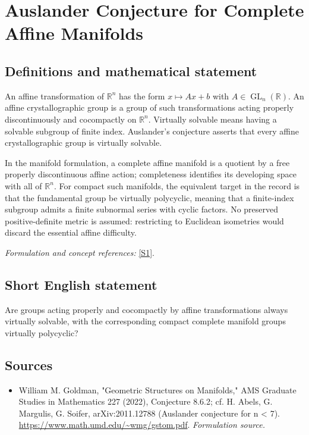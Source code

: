 \documentclass[11pt]{article}
\begin{document}
\section*{\texorpdfstring{Auslander Conjecture for Complete Affine Manifolds}{Auslander Conjecture for Complete Affine Manifolds}}\label{statement}
\subsection{Definitions and mathematical statement}
An affine transformation of ${\mathbb{R}}^n$ has the form $x\mapsto Ax+b$ with $A\in\operatorname{GL}_n({\mathbb{R}})$. An affine crystallographic group is a group of such transformations acting properly discontinuously and cocompactly on ${\mathbb{R}}^n$. Virtually solvable means having a solvable subgroup of finite index. Auslander's conjecture asserts that every affine crystallographic group is virtually solvable.

In the manifold formulation, a complete affine manifold is a quotient by a free properly discontinuous affine action; completeness identifies its developing space with all of ${\mathbb{R}}^n$. For compact such manifolds, the equivalent target in the record is that the fundamental group be virtually polycyclic, meaning that a finite-index subgroup admits a finite subnormal series with cyclic factors. No preserved positive-definite metric is assumed: restricting to Euclidean isometries would discard the essential affine difficulty.
\par\smallskip\textit{Formulation and concept references:} \href{https://www.math.umd.edu/~wmg/gstom.pdf}{[S1]}.

\subsection{Short English statement}
Are groups acting properly and cocompactly by affine transformations always virtually solvable, with the corresponding compact complete manifold groups virtually polycyclic?
\subsection{Sources}
\begin{itemize}
\item[S1]William M. Goldman, "Geometric Structures on Manifolds," AMS Graduate Studies in Mathematics 227 (2022), Conjecture 8.6.2; cf. H. Abels, G. Margulis, G. Soifer, arXiv:2011.12788 (Auslander conjecture for n < 7).
\url{https://www.math.umd.edu/~wmg/gstom.pdf}.
\textit{Formulation source.}
\end{itemize}
\end{document}
